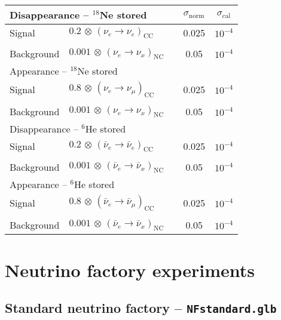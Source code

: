 \begin{center}
\begin{tabular}{|l|ll|c|c|}
\hline \hline
\multicolumn{3}{|l|}{Disappearance -- $^{18}$Ne stored} & $\sigma_\mathrm{norm}$ & $\sigma_\mathrm{cal}$ \\ \hline
Signal & $0.2 \, \otimes \, (\nu_e\rightarrow\nu_e)_{\mathrm{CC}}$ & \hspace{6cm} & 0.025 & $10^{-4}$ \\
 & & & & \\
Background & $0.001 \, \otimes \, (\nu_e \rightarrow \nu_x)_\mathrm{NC}$ & & 0.05 & $10^{-4}$ \\ \hline \hline 
\multicolumn{3}{|l|}{Appearance -- $^{18}$Ne stored} & & \\ \hline
Signal & $0.8 \, \otimes \, (\nu_e \rightarrow \nu_\mu)_\mathrm{CC}$ & & 0.025 & $10^{-4}$ \\
 & & & & \\
Background & $0.001 \, \otimes \, (\nu_e \rightarrow \nu_x)_\mathrm{NC}$ & & 0.05 & $10^{-4}$
\\ \hline \hline
\multicolumn{3}{|l|}{Disappearance -- $^6$He stored} & &  \\ \hline
Signal & $0.2 \, \otimes \, (\bar{\nu}_e\rightarrow\bar{\nu}_e)_{\mathrm{CC}}$ & & 0.025 & $10^{-4}$ \\
 & & & & \\
Background & $0.001 \, \otimes \, (\bar{\nu}_e \rightarrow \bar{\nu}_x)_\mathrm{NC}$ & & 0.05 & $10^{-4}$  \\ \hline \hline 
\multicolumn{3}{|l|}{Appearance -- $^6$He stored} & & \\ \hline
Signal & $0.8 \, \otimes \, (\bar{\nu}_e \rightarrow \bar{\nu}_\mu)_\mathrm{CC}$ & &
0.025 & $10^{-4}$ \\
 & & & & \\
Background & $0.001 \, \otimes \, (\bar{\nu}_e \rightarrow \bar{\nu}_x)_\mathrm{NC}$ & & 0.05 & $10^{-4}$ \\ \hline \hline
\end{tabular}
\end{center}

\section{Neutrino factory experiments}
\subsection*{Standard neutrino factory -- {\tt NFstandard.glb}}

